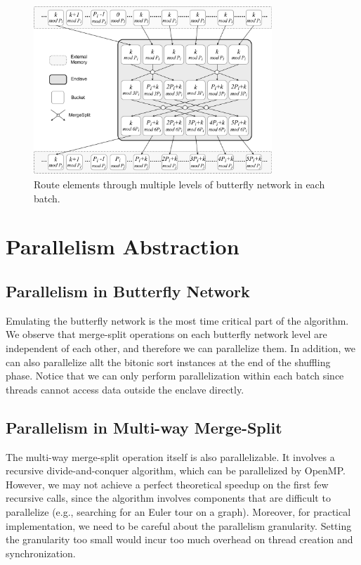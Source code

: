 \documentclass{article}
\begin{document}
\begin{figure}[thbp]
    \centering
    \includegraphics[width=0.8\textwidth]{assets/batch.png}
    \caption{Route elements through multiple levels of butterfly network in each batch.}
    \label{fig:batch}
\end{figure}

\section{Parallelism Abstraction}
\subsection{Parallelism in Butterfly Network}
Emulating the butterfly network is the most time critical part of the algorithm. We observe that merge-split operations on each butterfly network level are independent of each other, and therefore we can parallelize them. In addition, we can also parallelize allt the bitonic sort instances at the end of the shuffling phase. Notice that we can only perform parallelization within each batch since threads cannot access data outside the enclave directly.
\subsection{Parallelism in Multi-way Merge-Split}
The multi-way merge-split operation itself is also parallelizable. It involves a recursive divide-and-conquer algorithm, which can be parallelized by OpenMP. However, we may not achieve a perfect theoretical speedup on the first few recursive calls, since the algorithm involves components that are difficult to parallelize (e.g., searching for an Euler tour on a graph). Moreover, for practical implementation, we need to be careful about the parallelism granularity. Setting the granularity too small would incur too much overhead on thread creation and synchronization.
\end{document}
